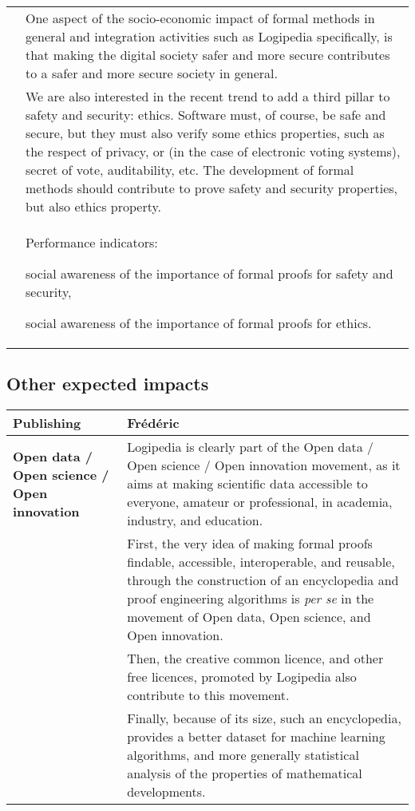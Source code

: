 \begin{longtable}{|p{}|p{}|}
&
One aspect of the socio-economic impact of formal methods in general
and integration activities such as Logipedia specifically, is that making the
digital society safer and more secure contributes to a safer and more
secure society in general.\\
&
\hspace{0.4cm} 
We are also interested in the recent trend to add a third pillar to
safety and security: ethics.  Software must, of course, be safe and
secure, but they must also verify some ethics properties, such as
the respect of privacy, or (in the case of electronic voting systems), 
secret of vote, auditability, etc.
The development of formal methods should contribute to prove 
safety and security properties, but also ethics property.
\\
&
\begin{framed}
Performance indicators: 
\begin{compactitem}
\item social awareness of the importance of formal proofs for safety and 
security, 
\item social awareness of the importance of formal proofs for ethics.
\end{compactitem}
\end{framed}
\\
\hline
\end{longtable}


\subsection*{Other expected impacts}

\begin{longtable}{|p{}|p{}|}
\hline
{\bf Publishing}
&
{\color{red} Frédéric}\\
\hline
{\bf Open data / Open science / Open innovation}
&
Logipedia is clearly part of the Open data / Open science / Open
innovation movement, as it aims at making scientific data accessible
to everyone, amateur or professional, in academia, industry, and
education.\\
&
\hspace{0.4cm}
First, the very idea of making formal proofs findable, accessible,
interoperable, and reusable, through the construction of an
encyclopedia and proof engineering algorithms is {\em per se} in the
movement of Open data, Open science, and Open innovation.\\
&
\hspace{0.4cm}
Then, the creative common licence, and other free licences, promoted by 
Logipedia also contribute to this movement.\\
&
\hspace{0.4cm}
Finally, because of its size, such an encyclopedia, provides a better
dataset for machine learning algorithms, and more generally
statistical analysis of the properties of mathematical developments.
\\
\hline
\end{longtable}


